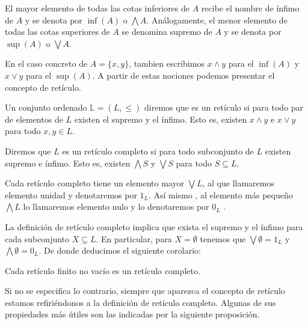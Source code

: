 \documentclass[oneside,openright,titlepage,numbers=noenddot,openany,headinclude,footinclude=true,
cleardoublepage=empty,abstractoff,BCOR=5mm,paper=a4,fontsize=12pt,main=spanish]{scrreprt}
\begin{document}
\begin{definition} El mayor elemento de todas las cotas inferiores de $A$ recibe el nombre de ínfimo de $A$ y se denota por $\inf(A)$ o $\bigwedge A$. Análogamente, el menor elemento de todas las cotas superiores de $A$ se denomina supremo de $A$ y se denota por $\sup(A)$ o $\bigvee A$. 
\end{definition}
 

En el caso concreto de $ A=\{x,y\}$, tambien escribimos $x \wedge y$ para el $\inf(A)$ y $x \vee y $ para el $\sup(A)$. A partir de estas nociones podemos presentar el concepto de retículo.

\begin{definition} Un conjunto ordenado $\mathbb{L} = (L,\leq)$  diremos que es un retículo si para todo par de elementos de $L$ existen el supremo y el ínfimo. Esto es, existen $x \wedge y$ e $x \vee y$ para todo $x,y \in L$.

\end{definition}

\begin{definition} Diremos que $L$ es un retículo completo si para todo subconjunto de $L$ existen supremo e ínfimo. Esto es,  existen $\bigwedge S$ y $\bigvee S$ para todo $S \subseteq L$.
\end{definition}

Cada retículo completo tiene un elemento mayor $\bigvee L$, al que llamaremos elemento unidad y denotaremos por \textbf{$1$}$_L$. Así mismo , al elemento más pequeño $\bigwedge L$ lo llamaremos elemento nulo y lo denotaremos por \textbf{$0$}$_L$ .

La definición de retículo completo implica que exista el supremo y el ínfimo para cada subconjunto $X\subseteq L$. En particular, para $X=\emptyset$ tenemos que $\bigvee \emptyset = $\textbf{$1$}$_L$ y $\bigwedge \emptyset =$\textbf{$0$}$_L$. De donde deducimos el siguiente corolario:

\begin{corollary}\cite{introduction_lattices}
Cada retículo finito no vacío es un retículo completo.
\end{corollary}

Si no se especifica lo contrario, siempre que aparezca el concepto de retículo estamos refiriéndonos a la definición de retículo completo. Algunas de sus propiedades más útiles son las indicadas por la siguiente proposición.
\end{document}
